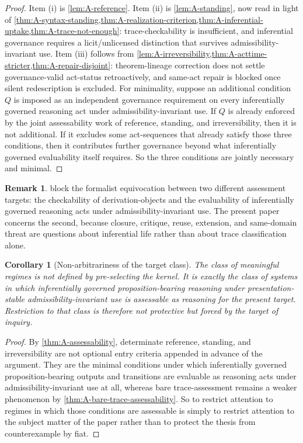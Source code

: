 \documentclass[11pt]{article}
\theoremstyle{plain}
\newtheorem{corollary}[theorem]{Corollary}
\theoremstyle{definition}
\newtheorem{remark}[theorem]{Remark}
\begin{document}
\begin{proof}
Item (i) is \cref{lem:A-reference}. Item (ii) is \cref{lem:A-standing}, now read in light of
\cref{thm:A-syntax-standing,thm:A-realization-criterion,thm:A-inferential-uptake,thm:A-trace-not-enough}: trace-checkability is insufficient, and inferential governance requires a licit/unlicensed distinction that survives admissibility-invariant use. Item (iii) follows from \cref{lem:A-irreversibility,thm:A-acttime-stricter,thm:A-repair-disjoint}: theorem-lineage correction does not settle governance-valid act-status retroactively, and same-act repair is blocked once silent redescription is excluded. For minimality, suppose an additional condition $Q$ is imposed as an independent governance requirement on every inferentially governed reasoning act under admissibility-invariant use. If $Q$ is already enforced by the joint assessability work of reference, standing, and irreversibility, then it is not additional. If it excludes some act-sequences that already satisfy those three conditions, then it contributes further governance beyond what inferentially governed evaluability itself requires. So the three conditions are jointly necessary and minimal.
\end{proof}

\begin{remark}
 block the formalist equivocation
between two different assessment targets: the checkability of derivation-objects and the evaluability
of inferentially governed reasoning acts under admissibility-invariant use. The present paper concerns the second, because closure,
critique, reuse, extension, and same-domain threat are questions about inferential life rather than about
trace classification alone.
\end{remark}

\begin{corollary}[Non-arbitrariness of the target class]
\label{cor:A-target-class}
The class of meaningful regimes is not defined by pre-selecting the kernel. It is exactly the class of systems in which inferentially governed proposition-bearing reasoning under presentation-stable admissibility-invariant use is assessable as reasoning for the present target. Restriction to that class is therefore not protective but forced by the target of inquiry.
\end{corollary}

\begin{proof}
By \cref{thm:A-assessability}, determinate reference, standing, and irreversibility are not optional entry criteria appended in advance of the argument. They are the minimal conditions under which inferentially governed proposition-bearing outputs and transitions are evaluable as reasoning acts under admissibility-invariant use at all, whereas bare trace-assessment remains a weaker phenomenon by \cref{thm:A-bare-trace-assessability}. So to restrict attention to regimes in which those conditions are assessable is simply to restrict attention to the subject matter of the paper rather than to protect the thesis from counterexample by fiat.
\end{proof}
\end{document}
